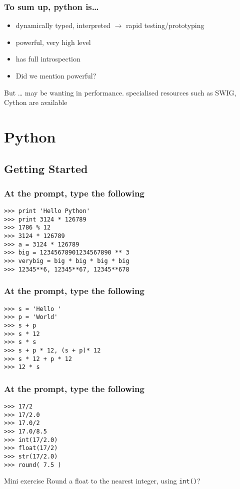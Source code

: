 \documentclass[14pt,compress]{beamer}
\newcounter{time}
\newcommand{\inctime}[1]{\addtocounter{time}{#1}{\tiny \thetime\ m}}
\begin{document}
\begin{frame}
  \frametitle{To sum up, python is\ldots}
  \begin{itemize}
  \item dynamically typed, interpreted $\rightarrow$ rapid testing/prototyping
  \item powerful, very high level
  \item has full introspection 
  \item Did we mention powerful?
  \end{itemize}
  \begin{block}{But \ldots}
    may be wanting in performance. specialised resources such as SWIG, \alert{Cython} are available 
  \end{block}
  \inctime{15}
\end{frame}


\section{Python}

\subsection{Getting Started}

\begin{frame}[fragile]
    \frametitle{At the prompt, type the following}
   \begin{lstlisting}
>>> print 'Hello Python' 
>>> print 3124 * 126789
>>> 1786 % 12
>>> 3124 * 126789
>>> a = 3124 * 126789
>>> big = 12345678901234567890 ** 3
>>> verybig = big * big * big * big 
>>> 12345**6, 12345**67, 12345**678
  \end{lstlisting}
\end{frame}

\begin{frame}[fragile]
    \frametitle{At the prompt, type the following}
   \begin{lstlisting}
>>> s = 'Hello '
>>> p = 'World'
>>> s + p 
>>> s * 12 
>>> s * s
>>> s + p * 12, (s + p)* 12
>>> s * 12 + p * 12
>>> 12 * s 
    \end{lstlisting}
\end{frame}

\begin{frame}[fragile]
    \frametitle{At the prompt, type the following}
  \begin{lstlisting}
>>> 17/2
>>> 17/2.0
>>> 17.0/2
>>> 17.0/8.5
>>> int(17/2.0)
>>> float(17/2)
>>> str(17/2.0)
>>> round( 7.5 )
  \end{lstlisting}
  \begin{block}{Mini exercise}
	Round a float to the nearest integer, using \texttt{int()}?
  \end{block}
\end{frame}
\end{document}
